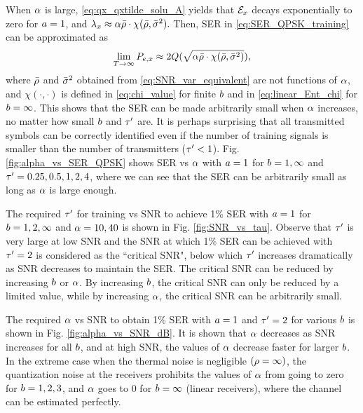 \documentclass[12pt, draftclsnofoot,journal,onecolumn]{IEEEtran}
\begin{document}
When $\alpha$ is large, \eqref{eq:qx_qxtilde_solu_A} yields that ${\mathcal{E}}_{x}$ decays exponentially to zero for $a=1$, and $\lambda_x\approx\alpha\bar{\rho}\cdot\chi(\bar{\rho},\bar{\sigma}_{}^2).$
Then, SER in \eqref{eq:SER_QPSK_training} can be approximated as
\begin{align}
    \lim_{T\to\infty} P_{e,x} \approx 2Q(\sqrt{\alpha\bar{\rho}\cdot\chi(\bar{\rho},\bar{\sigma}_{}^2)}),
    \label{eq:large_ration_SER_approx}
\end{align}
where $\bar{\rho}$ and $\bar{\sigma}_{}^2$ obtained from \eqref{eq:SNR_var_equivalent} are not functions of $\alpha$, and $\chi(\cdot,\cdot)$ is defined in \eqref{eq:chi_value} for finite $b$ and in \eqref{eq:linear_Ent_chi} for $b=\infty$.  This shows that the SER can be made arbitrarily small when $\alpha$ increases, no matter how small $b$ and $\tau'$ are.  It is perhaps surprising that all transmitted symbols can be correctly identified even if the number of training signals is smaller than the number of transmitters ($\tau'<1$).
Fig. \ref{fig:alpha_vs_SER_QPSK} shows SER vs $\alpha$ with $a=1$ for $b=1, \infty$ and $\tau'=0.25, 0.5, 1, 2, 4$, where we can see that the SER can be arbitrarily small as long as $\alpha$ is large enough.

The required $\tau'$ for training vs SNR to achieve 1\% SER with $a=1$ for $b=1, 2, \infty$ and $\alpha=10, 40$ is shown in Fig. \ref{fig:SNR_vs_tau}.    Observe that $\tau'$ is very large at low SNR and the SNR at which 1\% SER can be achieved with $\tau'=2$ is considered as the ``critical SNR", below which $\tau'$ increases dramatically as SNR decreases to maintain the SER. The critical SNR can be reduced by increasing $b$ or $\alpha$. By increasing $b$, the critical SNR can only be reduced by a limited value, while by increasing $\alpha$, the critical SNR can be arbitrarily small.

The required $\alpha$ vs SNR to obtain 1\% SER with $a=1$ and $\tau'=2$ for various $b$ is shown in Fig. \ref{fig:alpha_vs_SNR_dB}. It is shown that $\alpha$ decreases as SNR increases for all $b$, and at high SNR, the values of $\alpha$ decrease faster for larger $b$. %
In the extreme case when the thermal noise is negligible $(\rho=\infty)$, the quantization noise at the receivers prohibits the values of $\alpha$ from going to zero for $b=1,2,3$, and $\alpha$ goes to 0 for $b=\infty$ (linear receivers), where the channel can be estimated perfectly.
\end{document}
